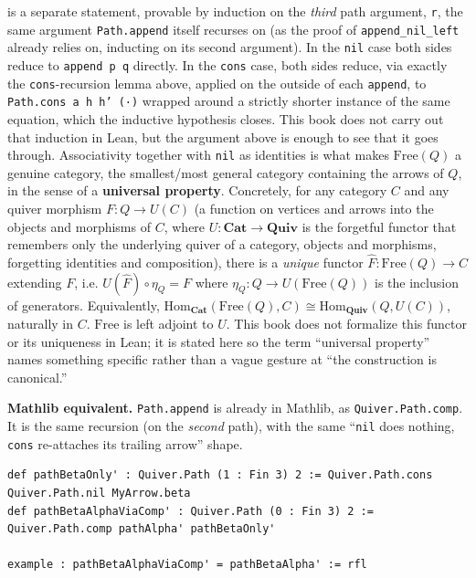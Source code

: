 is a separate statement, provable by induction on the \emph{third} path argument, \texttt{r}, the same argument \texttt{Path.append} itself recurses on (as the proof of \texttt{append\_\allowbreak{}nil\_\allowbreak{}left} already relies on, inducting on its second argument). In the \texttt{nil} case both sides reduce to \texttt{append p q} directly. In the \texttt{cons} case, both sides reduce, via exactly the \texttt{cons}-recursion lemma above, applied on the outside of each \texttt{append}, to \texttt{Path.cons a h h' (·)} wrapped around a strictly shorter instance of the same equation, which the inductive hypothesis closes. This book does not carry out that induction in Lean, but the argument above is enough to see that it goes through. Associativity together with \texttt{nil} as identities is what makes \(\mathrm{Free}(Q)\) a genuine category, the smallest/most general category containing the arrows of \(Q\), in the sense of a \textbf{universal property}. Concretely, for any category \(C\) and any quiver morphism \(F : Q \to U(C)\) (a function on vertices and arrows into the objects and morphisms of \(C\), where \(U : \mathbf{Cat} \to \mathbf{Quiv}\) is the forgetful functor that remembers only the underlying quiver of a category, objects and morphisms, forgetting identities and composition), there is a \emph{unique} functor \(\hat F : \mathrm{Free}(Q) \to C\) extending \(F\), i.e. \(U(\hat F) \circ \eta_Q = F\) where \(\eta_Q : Q \to U(\mathrm{Free}(Q))\) is the inclusion of generators. Equivalently, \(\mathrm{Hom}_{\mathbf{Cat}}(\mathrm{Free}(Q), C) \cong \mathrm{Hom}_{\mathbf{Quiv}}(Q, U(C))\), naturally in \(C\). \(\mathrm{Free}\) is left adjoint to \(U\). This book does not formalize this functor or its uniqueness in Lean; it is stated here so the term ``universal property'' names something specific rather than a vague gesture at ``the construction is canonical.''

\textbf{Mathlib equivalent.} \texttt{Path.append} is already in Mathlib, as \texttt{Quiver.Path.comp}. It is the same recursion (on the \emph{second} path), with the same ``\texttt{nil} does nothing, \texttt{cons} re-attaches its trailing arrow'' shape.

\begin{lstlisting}
def pathBetaOnly' : Quiver.Path (1 : Fin 3) 2 := Quiver.Path.cons Quiver.Path.nil MyArrow.beta
def pathBetaAlphaViaComp' : Quiver.Path (0 : Fin 3) 2 := Quiver.Path.comp pathAlpha' pathBetaOnly'

example : pathBetaAlphaViaComp' = pathBetaAlpha' := rfl
\end{lstlisting}

